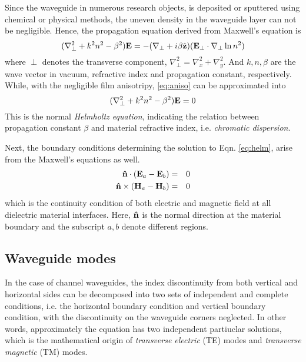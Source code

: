 Since the waveguide in numerous research objects, is deposited or sputtered using chemical or physical methods, the uneven density in the waveguide layer can not be negligible. Hence, the propagation equation derived from Maxwell's equation is
\begin{equation}\label{eq:aniso}
  (\nabla_{\perp}^2 + k^2 n^2 - \beta^2) \vb{E} = - (\nabla_{\perp} + i
  \beta \hat{\vb{z}}) (\vb{E_{\perp}}  \cdot \nabla_{\perp} \ln
  n^2)
\end{equation}
where $\perp$ denotes the transverse component, $\nabla_{\perp}^2 = \nabla_x^2 + \nabla_y^2$. And $k, n, \beta$ are the wave vector in vacuum, refractive index and propagation constant, respectively. While, with the negligible film anisotripy, \autoref{eq:aniso} can be approximated into
\begin{equation}\label{eq:helm}
  (\nabla_{\perp}^2 + k^2 n^2 - \beta^2) \vb{E} = 0
\end{equation}
This is the normal \textit{Helmholtz equation}, indicating the relation between propagation constant $\beta$ and material refractive index, i.e. \textit{chromatic dispersion}.

Next, the boundary conditions determining the solution to Eqn. \ref{eq:helm}, arise from the Maxwell's equations as well.
\begin{eqnarray*}%
  \vb{\hat{n}} \cdot (\vb{E}_a - \vb{E}_b) & = & 0 \\
  \vb{\hat{n}} \times (\vb{H}_a - \vb{H}_b) & = & 0
\end{eqnarray*}
which is the continuity condition of both electric and magnetic field at all dielectric material interfaces. Here, $\vb{\hat{n}}$ is the normal direction at the material boundary and the subscript $a, b$ denote different regions.

\subsection{Waveguide modes}
In the case of channel waveguides, the index discontinuity from both vertical and horizontal sides can be decomposed into two sets of independent and complete conditions, i.e. the horizontal boundary condition and vertical boundary condition, with the discontinuity on the waveguide corners neglected. In other words, approximately the equation has two independent partiuclar solutions, which is the mathematical origin of \textit{ transverse electric} (TE) modes and \textit{transverse magnetic} (TM) modes.

